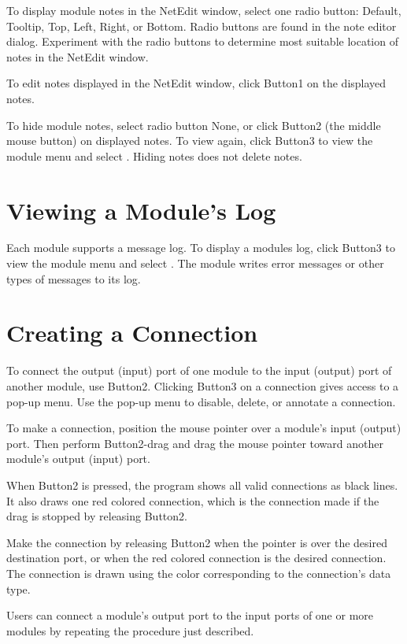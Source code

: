 To display module notes in the NetEdit window, select one radio
button: Default, Tooltip, Top, Left, Right, or Bottom. Radio buttons
are found in the note editor dialog.  Experiment with
the radio buttons to determine most suitable location of
notes in the NetEdit window.

To edit notes displayed in the NetEdit window, click Button1 on the
displayed notes.

To hide module notes, select radio button None, or click Button2 (the
middle mouse button) on displayed notes. To view again, click Button3 to
view the module menu and select . Hiding notes does
not delete notes.

\section{Viewing a Module's Log}
\label{sec:viewmodslog}

Each module supports a message log. To display a modules log, 
click Button3 to view the module menu and select
. The module writes error messages or
other types of messages to its log.

\section{Creating a Connection}
\label{sec:connectmods}

To connect the output (input) port of one module to the input (output)
port of another module, use Button2. Clicking Button3 on a connection
gives access to a pop-up menu. Use the pop-up menu to disable, delete,
or annotate a connection.

To make a connection, position the mouse pointer over a module's input
(output) port.  Then perform Button2-drag and drag the mouse pointer
toward another module's output (input) port.

When Button2 is pressed, the program shows all valid connections as black
lines.  It also draws one red colored connection, which is the
connection made if the drag is stopped by releasing Button2.

Make the connection by releasing Button2 when the pointer is over the
desired destination port, or when the red colored connection is the
desired connection.  The connection is drawn using the color
corresponding to the connection's data type.

Users can connect a module's output port to the input ports of one or more
modules by repeating the procedure just described.

